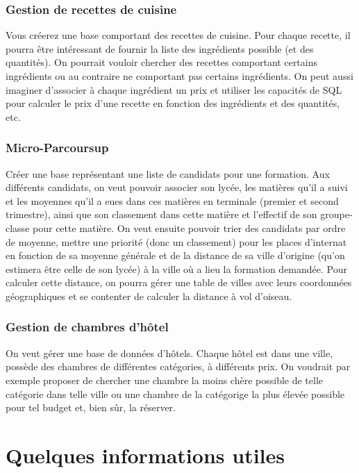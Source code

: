 \subsubsection{Gestion de recettes de cuisine}
Vous créerez une base comportant des recettes de cuisine. Pour chaque
recette, il pourra être intéressant de fournir la liste des
ingrédients possible (et des quantités). On pourrait vouloir chercher
des recettes comportant certains ingrédients ou au contraire ne
comportant pas certains ingrédients. On peut aussi imaginer d'associer
à chaque ingrédient un prix et utiliser les capacités de SQL pour
calculer le prix d'une recette en fonction des ingrédients et des
quantités, etc.

\subsubsection{Micro-Parcoursup}
Créer une base représentant une liste de candidats pour une formation.
Aux  différents candidats,  on veut  pouvoir associer  son lycée,  les
matières qu'il a suivi et les  moyennes qu'il a eues dans ces matières
en terminale (premier  et second trimestre), ainsi  que son classement
dans  cette matière  et  l'effectif de  son  groupe-classe pour  cette
matière.  On  veut ensuite  pouvoir trier des  candidats par  ordre de
moyenne,  mettre une  priorité (donc  un classement)  pour les  places
d'internat en fonction de sa moyenne  générale et de la distance de sa
ville d'origine (qu'on estimera être celle de son lycée) à la ville où
a lieu la formation demandée.  Pour calculer cette distance, on pourra
gérer    une    table    de     villes    avec    leurs    coordonnées
géographiques et
se contenter de calculer la distance à vol d'oiseau.

\subsubsection{Gestion de chambres d'hôtel}
On veut gérer une base de  données d'hôtels. Chaque hôtel est dans une
ville, possède  des chambres  de différentes catégories,  à différents
prix.  On voudrait  par exemple  proposer de  chercher une  chambre la
moins  chère possible  de  telle  catégorie dans  telle  ville ou  une
chambre de la catégorige la plus  élevée possible pour tel budget et,
bien sûr, la réserver.

\section{Quelques informations utiles}

